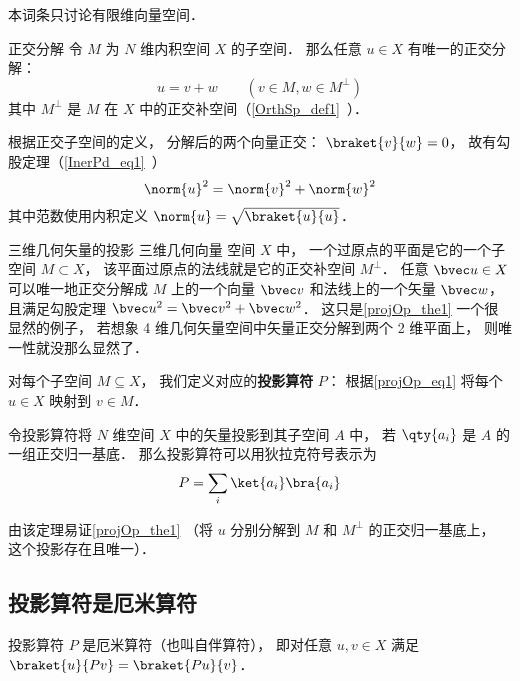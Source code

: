 

本词条只讨论有限维向量空间．

\begin{theorem}{正交分解}\label{projOp_the1}
令 $M$ 为 $N$ 维内积空间 $X$ 的子空间． 那么任意 $u\in X$ 有唯一的正交分解：
\begin{equation}\label{projOp_eq1}
u = v + w \qquad (v\in M, w\in M^\bot)
\end{equation}
其中 $M^\bot$ 是 $M$ 在 $X$ 中的正交补空间（\autoref{OrthSp_def1}~）．
\end{theorem}
根据正交子空间的定义， 分解后的两个向量正交： $\braket{v}{w} = 0$， 故有勾股定理（\autoref{InerPd_eq1}~）
\begin{equation}
\norm{u}^2 = \norm{v}^2 + \norm{w}^2
\end{equation}
其中范数使用内积定义 $\norm{u} = \sqrt{\braket{u}{u}}$．

\begin{example}{三维几何矢量的投影}
三维几何向量 空间 $X$ 中， 一个过原点的平面是它的一个子空间 $M \subset X$， 该平面过原点的法线就是它的正交补空间 $M^\bot$．  任意 $\bvec u \in X$ 可以唯一地正交分解成 $M$ 上的一个向量 $\bvec v$ 和法线上的一个矢量 $\bvec w$， 且满足勾股定理 $\bvec u^2 = \bvec v^2 + \bvec w^2$．
这只是\autoref{projOp_the1} 一个很显然的例子， 若想象 4 维几何矢量空间中矢量正交分解到两个 2 维平面上， 则唯一性就没那么显然了．
\end{example}

对每个子空间 $M\subseteq X$， 我们定义对应的\textbf{投影算符} $P$： 根据\autoref{projOp_eq1} 将每个 $u\in X$ 映射到 $v\in M$．

\begin{theorem}{}
令投影算符将 $N$ 维空间 $X$ 中的矢量投影到其子空间 $A$ 中， 若 $\qty{a_i}$ 是 $A$ 的一组正交归一基底． 那么投影算符可以用狄拉克符号表示为
\begin{equation}
P = \sum_i \ket{a_i}\bra{a_i}
\end{equation}
\end{theorem}
由该定理易证\autoref{projOp_the1} （将 $u$ 分别分解到 $M$ 和 $M^\bot$ 的正交归一基底上， 这个投影存在且唯一）．



\subsection{投影算符是厄米算符}
投影算符 $P$ 是厄米算符（也叫自伴算符）， 即对任意 $u, v\in X$ 满足 $\braket{u}{Pv} = \braket{Pu}{v}$．

